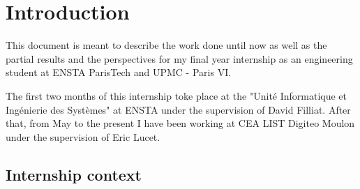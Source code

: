 
\pagestyle{fancy}
\fancyhead{}
\fancyhead[RE,LO]{\leftmark} %
\fancyfoot{}
\fancyfoot[OR,EL]{\thepage}


\section{Introduction}


This document is meant to describe the work done until now as well as the partial results and the perspectives for my final year internship as an engineering student at ENSTA ParisTech and UPMC - Paris VI.

The first two months of this internship toke place at the "Unité Informatique et Ingénierie des Systèmes" at ENSTA under the supervision of David Filliat. After that, from May to the present I have been working at CEA LIST Digiteo Moulon under the supervision of Eric Lucet.

\subsection{Internship context}

